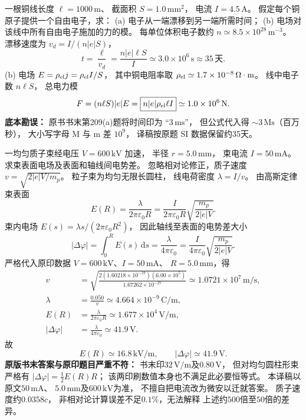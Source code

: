 一根铜线长度 $\ell=1000\,\mathrm m$、
截面积 $S=1.0\,\mathrm{mm^2}$，
电流 $I=4.5\,\mathrm A$。
假定每个铜原子提供一个自由电子，求：
(a) 电子从一端漂移到另一端所需时间；
(b) 电场对该线中所有自由电子施加的力的模。
\exsolution
每单位体积电子数约
$n\simeq8.5\times10^{28}\,\mathrm{m^{-3}}$。
漂移速度为 $v_d=I/(n|e|S)$，
\[
\boxed{t=\frac{\ell}{v_d}
=\frac{n|e|\ell S}{I}
\simeq3.0\times10^6\,\mathrm s
\approx35\,\text{天}}.
\]
(b) 电场
$E=\rho_{\rm el}j=\rho_{\rm el}I/S$，
其中铜电阻率取
$\rho_{\rm el}\simeq1.7\times10^{-8}\,
\Omega\cdot\mathrm m$。
线中电子数 $n\ell S$，
总电力模
\[
F=(n\ell S)|e|E
=\boxed{n|e|\rho_{\rm el}\ell I}
\simeq1.0\times10^6\,\mathrm N.
\]
\excheck \textbf{底本勘误：}
原书书末第209(a)题将时间印为
“$3\,\mathrm{ms}$”，
但公式代入得
$\sim3\,\mathrm{Ms}$（百万秒），
大小写字母 M 与 m 差 $10^9$，
译稿按原题 SI 数据保留约35天。

一均匀质子束经电压
$V=600\,\mathrm{kV}$ 加速，
半径 $r=5.0\,\mathrm{mm}$，
束电流 $I=50\,\mathrm{mA}$。
求束表面电场及表面和轴线间电势差。
\exsolution
忽略相对论修正，质子速度
$v=\sqrt{2|e|V/m_p}$。
粒子束为均匀无限长圆柱，
线电荷密度
$\lambda=I/v$。
由高斯定律束表面
\[
\boxed{E(R)=\frac{\lambda}{2\pi\varepsilon_0R}
=\frac I{2\pi\varepsilon_0R}
\sqrt{\frac{m_p}{2|e|V}}}.
\]
束内电场 $E(s)=\lambda s/
(2\pi\varepsilon_0R^2)$，
因此轴线至表面的电势差大小
\[
\boxed{|\Delta\varphi|=
\int_0^RE(s)\,\mathrm ds
=\frac{\lambda}{4\pi\varepsilon_0}
=\frac I{4\pi\varepsilon_0}
\sqrt{\frac{m_p}{2|e|V}}}.
\]
严格代入原印数据
$V=600\,\mathrm{kV}$、$I=50\,\mathrm{mA}$、
$R=5.0\,\mathrm{mm}$，得
\[
\begin{aligned}
v&=\sqrt{\frac{2(1.60218\times10^{-19})
(6.00\times10^5)}
{1.67262\times10^{-27}}}
\simeq1.0721\times10^7\,\mathrm{m/s},\\
\lambda&=\frac{0.050}{v}
\simeq4.664\times10^{-9}\,\mathrm{C/m},\\
E(R)&=\frac{\lambda}{2\pi\varepsilon_0R}
\simeq1.677\times10^4\,\mathrm{V/m},\\
|\Delta\varphi|&=\frac{\lambda}{4\pi\varepsilon_0}
\simeq41.9\,\mathrm V.
\end{aligned}
\]
故
\[
\boxed{E(R)\simeq16.8\,\mathrm{kV/m},\qquad
|\Delta\varphi|\simeq41.9\,\mathrm V}.
\]
\excheck \textbf{原版书末答案与原印题目严重不符：}
书末印$32\,\mathrm{V/m}$及$0.80\,\mathrm V$，
但对均匀圆柱形束严格有
$|\Delta\varphi|=\tfrac12 E(R)R$；
该两印刷数值本身也不满足此必要恒等式。
本译稿以原文$50\,\mathrm{mA}$、
$5.0\,\mathrm{mm}$及$600\,\mathrm{kV}$为准，
不擅自把电流改为微安以迁就答案。
质子速度约$0.0358c$，
非相对论计算误差不足$0.1\%$，无法解释
上述约$500$倍至$50$倍的差异。

